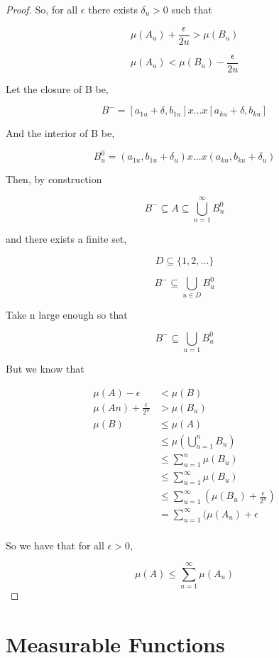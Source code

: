 \documentclass[11pt,fleqn]{book} %
\begin{document}
\begin{proof}
		So, for all $\epsilon$ there exists $\delta_u > 0$ such that 

				$$\mu(A_u) + \frac{\epsilon}{2u} > \mu(B_u)  $$

				$$ \mu(A_u) < \mu(B_u) - \frac{\epsilon}{2u} $$

		Let the closure of B be, 

				$$B^- =[a_{1u} + \delta, b_{1u} ] x \dots x [a_{ku}+ \delta, b_{ku} ]$$

		And the interior of B be, 

				$$B_u^0 = (a_{1u}, b_{1u} + \delta_u) x \dots x (a_{ku}, b_{ku} + \delta_u)$$

		Then, by construction

				$$B^- \subseteq A \subseteq \bigcup^\infty_{n=1} B_n^0 $$

		and there exists a finite set, 

				$$D \subseteq \{1, 2, \dots\} $$

				$$B^- \subseteq \bigcup_{u \in D} B_u^0 $$


		Take n large enough so that 

				$$B^- \subseteq \bigcup_{u = 1} B_u^0 $$

		But we know that 


			\begin{align}
				\mu(A) - \epsilon &< \mu(B)\\
				\mu(An) + \frac{\epsilon}{2^n} &> \mu(B_u)\\
				\mu(B) &\leq \mu(A)\\
					&\leq \mu(\bigcup^n_{u=1} B_u)\\
					&\leq  \sum^n_{u=1} \mu( B_u)\\
					& \leq \sum^\infty_{u=1} \mu( B_u)\\
					& \leq \sum^\infty_{u=1}( \mu( B_u) + \frac{\epsilon}{2^u})\\
					&=  \sum^\infty_{u=1}( \mu(A_u) + \epsilon\\
			\end{align}

	So we have that for all $\epsilon > 0$, 

			$$\mu(A) \leq \sum^\infty_{u=1} \mu(A_u) $$

\end{proof}



\section{Measurable Functions}
\end{document}
